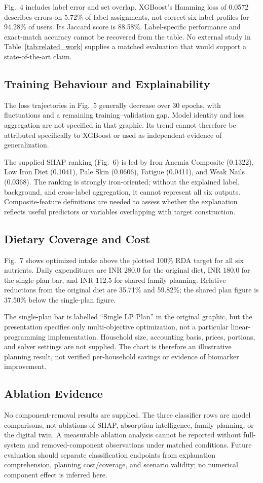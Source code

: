 \documentclass[conference]{IEEEtran}
\begin{document}
Fig.~4 includes label error and set overlap. XGBoost's Hamming loss of 0.0572 describes errors on 5.72\% of label assignments, not correct six-label profiles for 94.28\% of users. Its Jaccard score is 88.58\%. Label-specific performance and exact-match accuracy cannot be recovered from the table. No external study in Table~\ref{tab:related_work} supplies a matched evaluation that would support a state-of-the-art claim.

\subsection{Training Behaviour and Explainability}
The loss trajectories in Fig.~5 generally decrease over 30 epochs, with fluctuations and a remaining training--validation gap. Model identity and loss aggregation are not specified in that graphic. Its trend cannot therefore be attributed specifically to XGBoost or used as independent evidence of generalization.

The supplied SHAP ranking (Fig.~6) is led by Iron Anemia Composite (0.1322), Low Iron Diet (0.1041), Pale Skin (0.0606), Fatigue (0.0411), and Weak Nails (0.0368). The ranking is strongly iron-oriented; without the explained label, background, and cross-label aggregation, it cannot represent all six outputs. Composite-feature definitions are needed to assess whether the explanation reflects useful predictors or variables overlapping with target construction.

\subsection{Dietary Coverage and Cost}
Fig.~7 shows optimized intake above the plotted 100\% RDA target for all six nutrients. Daily expenditures are INR 280.0 for the original diet, INR 180.0 for the single-plan bar, and INR 112.5 for shared family planning. Relative reductions from the original diet are 35.71\% and 59.82\%; the shared plan figure is 37.50\% below the single-plan figure.

The single-plan bar is labelled ``Single LP Plan'' in the original graphic, but the presentation specifies only multi-objective optimization, not a particular linear-programming implementation. Household size, accounting basis, prices, portions, and solver settings are not supplied. The chart is therefore an illustrative planning result, not verified per-household savings or evidence of biomarker improvement.

\subsection{Ablation Evidence}
No component-removal results are supplied. The three classifier rows are model comparisons, not ablations of SHAP, absorption intelligence, family planning, or the digital twin. A measurable ablation analysis cannot be reported without full-system and removed-component observations under matched conditions. Future evaluation should separate classification endpoints from explanation comprehension, planning cost/coverage, and scenario validity; no numerical component effect is inferred here.
\end{document}
